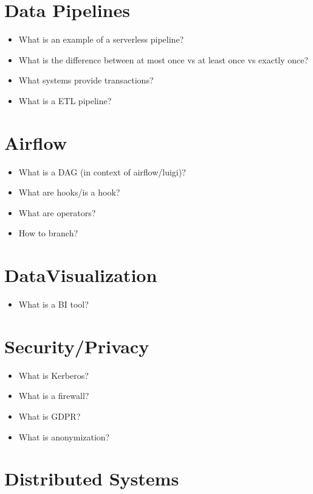 \documentclass[12pt, numbers=noenddot]{scrreprt} %
\begin{document}
\section*{Data Pipelines}

\begin{itemize}
\item  What is an example of a serverless pipeline?
\item  What is the difference between at most once vs at least once vs exactly once?
\item  What systems provide transactions?
\item  What is a ETL pipeline?
\end{itemize}

\section*{Airflow}

\begin{itemize}
\item What is a DAG (in context of airflow/luigi)?
\item What are hooks/is a hook?
\item What are operators?
\item How to branch?
\end{itemize}

\section*{DataVisualization}

\begin{itemize}
\item What is a BI tool?
\end{itemize}

\section*{Security/Privacy}

\begin{itemize}
\item What is Kerberos?
\item What is a firewall?
\item What is GDPR?
\item What is anonymization?
\end{itemize}

\section*{Distributed Systems}
\end{document}
